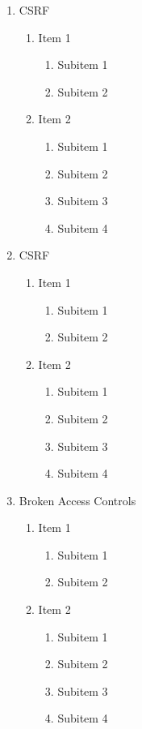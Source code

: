 \documentclass[12pt, letter-paper]{article}
\begin{document}
\begin{enumerate}
\item CSRF
  \begin{enumerate}
  \item Item 1
    \begin{enumerate}
    \item Subitem 1
    \item Subitem 2
    \end{enumerate}
  \item Item 2
    \begin{enumerate}
    \item Subitem 1
    \item Subitem 2
    \item Subitem 3
    \item Subitem 4
    \end{enumerate}
  \end{enumerate}

\item CSRF
  \begin{enumerate}
  \item Item 1
    \begin{enumerate}
    \item Subitem 1
    \item Subitem 2
    \end{enumerate}
  \item Item 2
    \begin{enumerate}
    \item Subitem 1
    \item Subitem 2
    \item Subitem 3
    \item Subitem 4
    \end{enumerate}
  \end{enumerate}

\item Broken Access Controls
  \begin{enumerate}
  \item Item 1
    \begin{enumerate}
    \item Subitem 1
    \item Subitem 2
    \end{enumerate}
  \item Item 2
    \begin{enumerate}
    \item Subitem 1
    \item Subitem 2
    \item Subitem 3
    \item Subitem 4
    \end{enumerate}
  \end{enumerate}


\end{enumerate}
\end{document}
